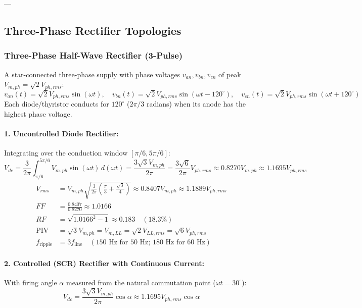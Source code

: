 ---

\subsection{Three-Phase Rectifier Topologies}

\subsubsection{Three-Phase Half-Wave Rectifier (3-Pulse)}
A star-connected three-phase supply with phase voltages $v_{an}, v_{bn}, v_{cn}$ of peak $V_{m,ph} = \sqrt{2} V_{ph,rms}$:
\begin{equation}
v_{an}(t) = \sqrt{2} V_{ph,rms}\sin(\omega t), \quad v_{bn}(t) = \sqrt{2} V_{ph,rms}\sin(\omega t - 120^\circ), \quad v_{cn}(t) = \sqrt{2} V_{ph,rms}\sin(\omega t + 120^\circ)
\end{equation}
Each diode/thyristor conducts for $120^\circ$ ($2\pi/3$ radians) when its anode has the highest phase voltage.

\paragraph{1. Uncontrolled Diode Rectifier:}
Integrating over the conduction window $[\pi/6, 5\pi/6]$:
\begin{equation}
V_{dc} = \frac{3}{2\pi}\int_{\pi/6}^{5\pi/6} V_{m,ph}\sin(\omega t)\,d(\omega t) = \frac{3\sqrt{3} V_{m,ph}}{2\pi} = \frac{3\sqrt{6}}{2\pi} V_{ph,rms} \approx 0.8270 V_{m,ph} \approx 1.1695 V_{ph,rms}
\end{equation}
\begin{align}
V_{rms} &= V_{m,ph}\sqrt{\frac{3}{2\pi}\left(\frac{\pi}{3} + \frac{\sqrt{3}}{4}\right)} \approx 0.8407 V_{m,ph} \approx 1.1889 V_{ph,rms} \\
FF &= \frac{0.8407}{0.8270} \approx 1.0166 \\
RF &= \sqrt{1.0166^2 - 1} \approx 0.183 \quad (18.3\%) \\
\text{PIV} &= \sqrt{3} V_{m,ph} = V_{m,LL} = \sqrt{2} V_{LL,rms} = \sqrt{6} V_{ph,rms} \\
f_{\mathrm{ripple}} &= 3 f_{\mathrm{line}} \quad (150\text{ Hz for 50 Hz; } 180\text{ Hz for 60 Hz})
\end{align}

\paragraph{2. Controlled (SCR) Rectifier with Continuous Current:}
With firing angle $\alpha$ measured from the natural commutation point ($\omega t = 30^\circ$):
\begin{equation}
V_{dc} = \frac{3\sqrt{3} V_{m,ph}}{2\pi}\cos\alpha \approx 1.1695 V_{ph,rms}\cos\alpha
\end{equation}


